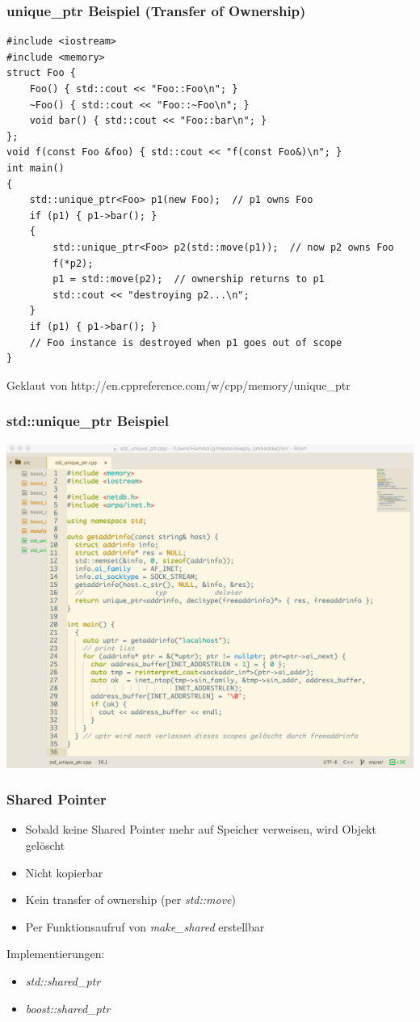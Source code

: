 \documentclass{beamer}
\begin{document}
\begin{frame}[fragile]
 \frametitle{unique\_ptr Beispiel (Transfer of Ownership)}
 \begin{lstlisting}
#include <iostream>
#include <memory>
struct Foo {
    Foo() { std::cout << "Foo::Foo\n"; }
    ~Foo() { std::cout << "Foo::~Foo\n"; }
    void bar() { std::cout << "Foo::bar\n"; }
};
void f(const Foo &foo) { std::cout << "f(const Foo&)\n"; }
int main()
{
    std::unique_ptr<Foo> p1(new Foo);  // p1 owns Foo
    if (p1) { p1->bar(); }
    {
        std::unique_ptr<Foo> p2(std::move(p1));  // now p2 owns Foo
        f(*p2);
        p1 = std::move(p2);  // ownership returns to p1
        std::cout << "destroying p2...\n";
    }
    if (p1) { p1->bar(); }
    // Foo instance is destroyed when p1 goes out of scope
}
 \end{lstlisting}
 \tiny Geklaut von http://en.cppreference.com/w/cpp/memory/unique\_ptr
 \normalsize
\end{frame}

\begin{frame}[fragile]
 \frametitle{std::unique\_ptr Beispiel}
 \includegraphics[scale=.265]{unique_ptr_usage}
\end{frame}

\begin{frame}
 \frametitle{Shared Pointer}
 \begin{itemize}
  \item Sobald keine Shared Pointer mehr auf Speicher verweisen, wird Objekt gelöscht
  \item Nicht kopierbar
  \item Kein transfer of ownership (per \textit{std::move})
  \item Per Funktionsaufruf von \textit{make\_shared} erstellbar
 \end{itemize}
 Implementierungen:
 \begin{itemize}
 	\item \textit{std::shared\_ptr}
 	\item \textit{boost::shared\_ptr}
 \end{itemize}
\end{frame}
\end{document}
